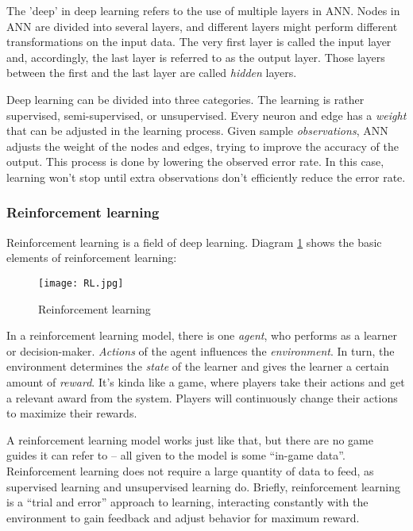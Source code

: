 \documentclass{mcmthesis}
\begin{document}
The 'deep' in deep learning refers to the use of multiple layers in ANN.
Nodes in ANN are divided into several layers,
and different layers might perform different transformations on the input data.
The very first layer is called the input layer and,
accordingly, the last layer is referred to as the output layer.
Those layers between the first and the last layer are called \textit{hidden} layers.

Deep learning can be divided into three categories.
The learning is rather supervised, semi-supervised, or unsupervised.
Every neuron and edge has a \textit{weight} that can be adjusted in the learning process.
Given sample \textit{observations}, ANN adjusts the weight of the nodes and edges,
trying to improve the accuracy of the output.
This process is done by lowering the observed error rate.
In this case, learning won't stop until
extra observations don't efficiently reduce the error rate.

\subsubsection{Reinforcement learning}

 Reinforcement learning is a field of deep learning.
Diagram \ref{LA} shows the basic elements of reinforcement learning:

\begin{figure}[h]
  \small
  \centering
  \texttt{[image: RL.jpg]}
  \caption{Reinforcement learning} \label{LA}
\end{figure}

In a reinforcement learning model, there is one \textit{agent},
who performs as a learner or decision-maker.
\textit{Actions} of the agent influences the \textit{environment}.
In turn, the environment determines the \textit{state} of the learner
and gives the learner a certain amount of \textit{reward}.
It's kinda like a game, where players take their actions and get a relevant award from the system.
Players will continuously change their actions to maximize their rewards.

A reinforcement learning model works just like that,
but there are no game guides it can refer to --
all given to the model is some ``in-game data''.
Reinforcement learning does not require a large quantity of data to feed,
as supervised learning and unsupervised learning do.
Briefly, reinforcement learning is a ``trial and error'' approach to learning,
interacting constantly with the environment to gain feedback and
adjust behavior for maximum reward.
\end{document}
